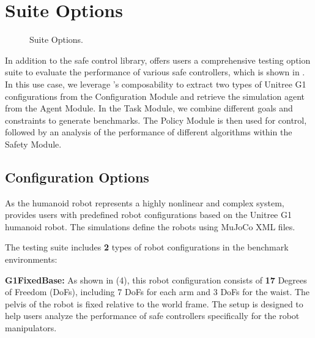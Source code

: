 \section{\spark Suite Options}
\label{sec: suite_options}


\begin{figure}[htbp]
    \centering
    \vspace{2.5cm}  %
    \vspace{2.3cm}
    \caption{\spark Suite Options.}
    \label{fig:Suite}
\end{figure}
In addition to the safe control library, \spark offers users a comprehensive testing option suite to evaluate the performance of various safe controllers, which is shown in . In this use case, we leverage \spark's composability to extract two types of Unitree G1 configurations from the Configuration Module and retrieve the simulation agent from the Agent Module. In the Task Module, we combine different goals and constraints to generate benchmarks. The Policy Module is then used for control, followed by an analysis of the performance of different algorithms within the Safety Module.
\subsection{Configuration Options} 

As the humanoid robot represents a highly nonlinear and complex system, \spark provides users with predefined robot configurations based on the Unitree G1 humanoid robot. 
The simulations define the robots using MuJoCo XML files.  

The testing suite includes \textbf{2} types of robot configurations in the benchmark environments:  


\textbf{G1FixedBase:} As shown in  (4), this robot configuration consists of \textbf{17} Degrees of Freedom (DoFs), including 7 DoFs for each arm and 3 DoFs for the waist. The pelvis of the robot is fixed relative to the world frame. The setup is designed to help users analyze the performance of safe controllers specifically for the robot manipulators.  




